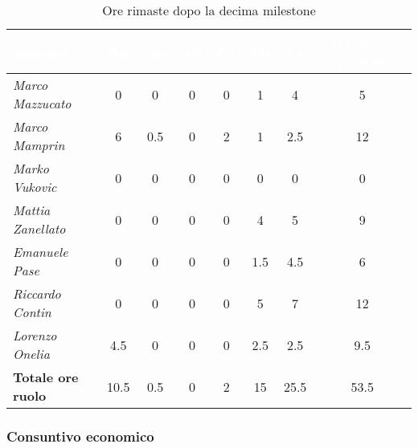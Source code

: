 \begin{table}[H]
    \renewcommand\arraystretch{1.5}
    \centering
    \begin{tabular}{|l|c|c|c|c|c|c|c|}
    \hline
    \rowcolor[HTML]{036400}
    \textcolor{white}{\textbf{Membro}} & \multicolumn{1}{c|}{\textcolor{white}{\textbf{RE}}} & \multicolumn{1}{c|}{\textcolor{white}{\textbf{AM}}} & \multicolumn{1}{c|}{\textcolor{white}{\textbf{AN}}} & \multicolumn{1}{c|}{\textcolor{white}{\textbf{PT}}} & \multicolumn{1}{c|}{\textcolor{white}{\textbf{PR}}} & \multicolumn{1}{c|}{\textcolor{white}{\textbf{VE}}} & \multicolumn{1}{c|}{\textcolor{white}{\textbf{Totale ore persona}}} \\ \hline
    \rowcolor[HTML]{EFEFEF}\textit{Marco Mazzucato}  & 0    & 0    & 0     & 0     & 1   & 4      & 5   \\ \hline
    \rowcolor[HTML]{C0C0C0}\textit{Marco Mamprin}    & 6    & 0.5    & 0     & 2     & 1   & 2.5      & 12   \\ \hline
    \rowcolor[HTML]{EFEFEF}\textit{Marko Vukovic}    & 0    & 0    & 0     & 0     & 0   & 0      & 0    \\ \hline
    \rowcolor[HTML]{C0C0C0}\textit{Mattia Zanellato} & 0    & 0    & 0     & 0     & 4   & 5      & 9   \\ \hline
    \rowcolor[HTML]{EFEFEF}\textit{Emanuele Pase}    & 0    & 0    & 0     & 0     & 1.5   & 4.5    & 6 \\ \hline
    \rowcolor[HTML]{C0C0C0}\textit{Riccardo Contin}  & 0    & 0    & 0     & 0     & 5   & 7      & 12   \\ \hline
    \rowcolor[HTML]{EFEFEF}\textit{Lorenzo Onelia}   & 4.5  & 0    & 0     & 0     & 2.5   & 2.5      & 9.5 \\ \hline
    \rowcolor[HTML]{C0C0C0}\textbf{Totale ore ruolo} & 10.5 & 0.5    & 0     & 2     & 15  & 25.5   & 53.5   \\ \hline
    \end{tabular}
    \caption{Ore rimaste dopo la decima milestone}
\end{table}

\subsubsection{Consuntivo economico}

